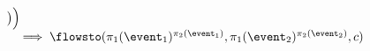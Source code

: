 \begin{lem}
\[\begin{array}{l}
				\big)
			\Big) 
			\\ \quad 
			\implies 
			\flowsto(\pi_1(\event_1)^{\pi_2(\event_1)}, \pi_1(\event_2)^{\pi_2(\event_2)}, c)
		\end{array}
		\]
\end{lem}
%
